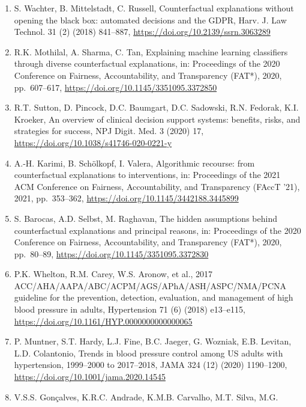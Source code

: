 \documentclass[
  11pt,
]{article}
\providecommand{\tightlist}{%
  \setlength{\itemsep}{0pt}\setlength{\parskip}{0pt}}
\begin{document}
\begin{enumerate}
\def\labelenumi{\arabic{enumi}.}
\tightlist
\item
  S. Wachter, B. Mittelstadt, C. Russell, Counterfactual explanations
  without opening the black box: automated decisions and the GDPR, Harv.
  J. Law Technol. 31 (2) (2018) 841--887,
  \url{https://doi.org/10.2139/ssrn.3063289}
\item
  R.K. Mothilal, A. Sharma, C. Tan, Explaining machine learning
  classifiers through diverse counterfactual explanations, in:
  Proceedings of the 2020 Conference on Fairness, Accountability, and
  Transparency (FAT*), 2020, pp.~607--617,
  \url{https://doi.org/10.1145/3351095.3372850}
\item
  R.T. Sutton, D. Pincock, D.C. Baumgart, D.C. Sadowski, R.N. Fedorak,
  K.I. Kroeker, An overview of clinical decision support systems:
  benefits, risks, and strategies for success, NPJ Digit. Med. 3 (2020)
  17, \url{https://doi.org/10.1038/s41746-020-0221-y}
\item
  A.-H. Karimi, B. Schölkopf, I. Valera, Algorithmic recourse: from
  counterfactual explanations to interventions, in: Proceedings of the
  2021 ACM Conference on Fairness, Accountability, and Transparency
  (FAccT '21), 2021, pp.~353--362,
  \url{https://doi.org/10.1145/3442188.3445899}
\item
  S. Barocas, A.D. Selbst, M. Raghavan, The hidden assumptions behind
  counterfactual explanations and principal reasons, in: Proceedings of
  the 2020 Conference on Fairness, Accountability, and Transparency
  (FAT*), 2020, pp.~80--89,
  \url{https://doi.org/10.1145/3351095.3372830}
\item
  P.K. Whelton, R.M. Carey, W.S. Aronow, et al., 2017
  ACC/\allowbreak{}AHA/\allowbreak{}AAPA/\allowbreak{}ABC/\allowbreak{}ACPM/\allowbreak{}AGS/\allowbreak{}APhA/\allowbreak{}ASH/\allowbreak{}ASPC/\allowbreak{}NMA/\allowbreak{}PCNA
  guideline for the prevention, detection, evaluation, and management of
  high blood pressure in adults, Hypertension 71 (6) (2018) e13--e115,
  \url{https://doi.org/10.1161/HYP.0000000000000065}
\item
  P. Muntner, S.T. Hardy, L.J. Fine, B.C. Jaeger, G. Wozniak, E.B.
  Levitan, L.D. Colantonio, Trends in blood pressure control among US
  adults with hypertension, 1999--2000 to 2017--2018, JAMA 324 (12)
  (2020) 1190--1200, \url{https://doi.org/10.1001/jama.2020.14545}
\item
  V.S.S. Gonçalves, K.R.C. Andrade, K.M.B. Carvalho, M.T. Silva, M.G.

\end{enumerate}
\end{document}
